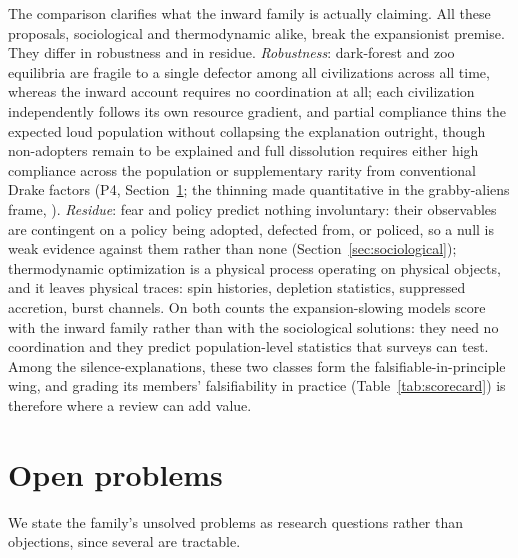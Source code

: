 \documentclass[11pt]{article}
\begin{document}
The comparison clarifies what the inward family is actually claiming. All these proposals, sociological and thermodynamic alike, break the expansionist premise. They differ in robustness and in residue. \emph{Robustness}: dark-forest and zoo equilibria are fragile to a single defector among all civilizations across all time, whereas the inward account requires no coordination at all; each civilization independently follows its own resource gradient, and partial compliance thins the expected loud population without collapsing the explanation outright, though non-adopters remain to be explained and full dissolution requires either high compliance across the population or supplementary rarity from conventional Drake factors (P4, Section~\ref{sec:problems}; the thinning made quantitative in the grabby-aliens frame, \citealt{Hanson2021}). \emph{Residue}: fear and policy predict nothing involuntary: their observables are contingent on a policy being adopted, defected from, or policed, so a null is weak evidence against them rather than none (Section~\ref{sec:sociological}); thermodynamic optimization is a physical process operating on physical objects, and it leaves physical traces: spin histories, depletion statistics, suppressed accretion, burst channels. On both counts the expansion-slowing models score with the inward family rather than with the sociological solutions: they need no coordination and they predict population-level statistics that surveys can test. Among the silence-explanations, these two classes form the falsifiable-in-principle wing, and grading its members' falsifiability in practice (Table~\ref{tab:scorecard}) is therefore where a review can add value.

\section{Open problems}
\label{sec:problems}

We state the family's unsolved problems as research questions rather than objections, since several are tractable.
\end{document}
